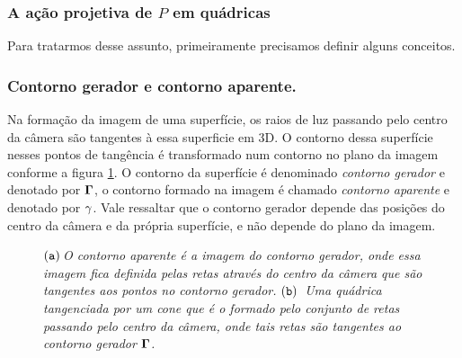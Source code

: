 \subsubsection{A ação projetiva de $P$ em quádricas}\label{sec.proj-quadricas}
Para tratarmos desse assunto, primeiramente precisamos definir alguns conceitos.

\subsubsection*{Contorno gerador e contorno aparente.}
Na formação da imagem de uma superfície, os raios de luz passando pelo centro da câmera são tangentes à essa superficie em 3D. O contorno dessa superfície nesses pontos de tangência é transformado num contorno no plano da imagem conforme a figura \ref{fig.cont-gerador-aparente}. O contorno da superfície é denominado \textit{contorno gerador} e denotado por ${\bf \Gamma}$, o contorno formado na imagem é chamado \textit{contorno aparente} e denotado por ${\bf \gamma}$. Vale ressaltar que o contorno gerador depende das posições do centro da câmera e da própria superfície, e não depende do plano da imagem.  

\begin{figure}[htb!]
\centering
{}
\caption{\textit{$({\tt a})\,$O contorno aparente é a imagem do contorno gerador, onde essa imagem fica definida pelas retas através do centro da câmera que são tangentes aos pontos no contorno gerador.$\,\,({\tt b})\,$ Uma quádrica tangenciada por um cone que é o formado pelo conjunto de retas passando pelo centro da câmera, onde tais retas são tangentes ao contorno gerador ${\bf \Gamma}$. }}
\label{fig.cont-gerador-aparente}
\end{figure}

